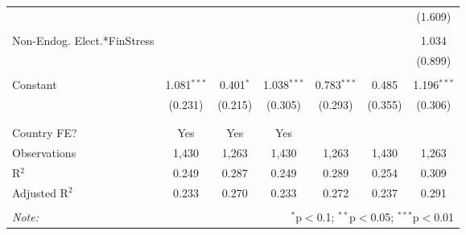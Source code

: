 \begin{table}[!htbp]
\begin{tabular}{@{\extracolsep{5pt}}lcccccc}
  &  &  &  &  &  & (1.609) \\ 
  & & & & & & \\ 
 Non-Endog. Elect.*FinStress &  &  &  &  &  & 1.034 \\ 
  &  &  &  &  &  & (0.899) \\ 
  & & & & & & \\ 
 Constant & 1.081$^{***}$ & 0.401$^{*}$ & 1.038$^{***}$ & 0.783$^{***}$ & 0.485 & 1.196$^{***}$ \\ 
  & (0.231) & (0.215) & (0.305) & (0.293) & (0.355) & (0.306) \\ 
  & & & & & & \\ 
\hline \\[-1.8ex] 
Country FE? & Yes & Yes & Yes &  &  &  \\ 
Observations & 1,430 & 1,263 & 1,430 & 1,263 & 1,430 & 1,263 \\ 
R$^{2}$ & 0.249 & 0.287 & 0.249 & 0.289 & 0.254 & 0.309 \\ 
Adjusted R$^{2}$ & 0.233 & 0.270 & 0.233 & 0.272 & 0.237 & 0.291 \\ 
\hline 
\hline \\[-1.8ex] 
\textit{Note:}  & \multicolumn{6}{r}{$^{*}$p$<$0.1; $^{**}$p$<$0.05; $^{***}$p$<$0.01} \\ 
\end{tabular} 
\end{table} 
